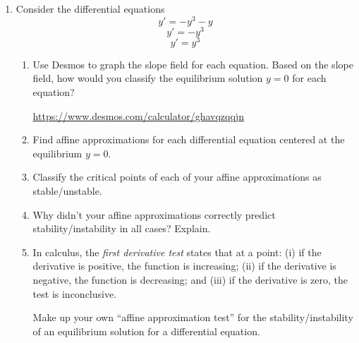 \begin{enumerate}
	\item Consider the differential equations
	      \begin{equation}
		      y'=-y^3-y \tag{A}
	      \end{equation}
	      \begin{equation}
		      y'=-y^3 \tag{B}
	      \end{equation}
	      \begin{equation}
		      y'=y^3 \tag{C}
	      \end{equation}
	      \begin{enumerate}
		      \item Use Desmos to graph the slope field for each equation. Based on the slope
		            field, how would you classify the equilibrium solution $y=0$ for each equation?

		            \url{https://www.desmos.com/calculator/ghavqzqqjn}
		      \item Find affine approximations for each differential equation centered at the equilibrium $y=0$.
		      \item Classify the critical points of each of your affine approximations as stable/unstable.
		      \item Why didn't your affine approximations correctly predict stability/instability in all cases? Explain.
		      \item In calculus, the \emph{first derivative test} states that at a point:
		            (i) if the derivative is positive, the function is increasing; (ii)
		            if				  the derivative is negative, the function is decreasing; and
		            (iii) if the derivative is zero, the test is inconclusive.

		            Make up your own ``affine approximation test'' for the stability/instability of an equilibrium solution
		            for a differential equation.
	      \end{enumerate}


\end{enumerate}
